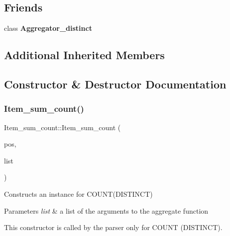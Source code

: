 \subsection*{Friends}
\begin{DoxyCompactItemize}
\item 
\mbox{\label{classItem__sum__count_a40fcb2830e29e49349d865893b6d0b7d}} 
class {\bfseries Aggregator\+\_\+distinct}
\end{DoxyCompactItemize}
\subsection*{Additional Inherited Members}


\subsection{Constructor \& Destructor Documentation}
\mbox{\label{classItem__sum__count_a57a151ea99647b3a61a757ffb7adc3ae}} 
\subsubsection{\texorpdfstring{Item\+\_\+sum\+\_\+count()}{Item\_sum\_count()}}
{\footnotesize\ttfamily Item\+\_\+sum\+\_\+count\+::\+Item\+\_\+sum\+\_\+count (\begin{DoxyParamCaption}\item[{const \mbox{\hyperlink{structYYLTYPE}{P\+OS}} \&}]{pos,  }\item[{\mbox{\hyperlink{classPT__item__list}{P\+T\+\_\+item\+\_\+list}} $\ast$}]{list }\end{DoxyParamCaption})\hspace{0.3cm}{\ttfamily [inline]}}

Constructs an instance for C\+O\+U\+N\+T(\+D\+I\+S\+T\+I\+N\+C\+T)


\begin{DoxyParams}{Parameters}
{\em list} & a list of the arguments to the aggregate function\\
\hline
\end{DoxyParams}
This constructor is called by the parser only for C\+O\+U\+NT (D\+I\+S\+T\+I\+N\+CT). 

